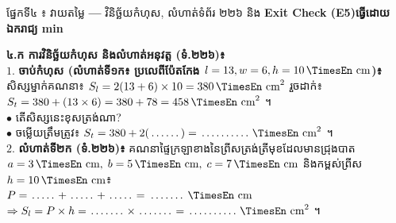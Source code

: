 \documentclass[a4paper,10pt]{article}
\newcommand{\en}[1]{{\TimesEn #1}}
\newcommand{\enbf}[1]{{\TimesEn\textbf{#1}}}
\newcommand{\unit}[1]{\,\text{\en{#1}}}
\newcommand{\blank}[1]{\makebox[#1]{\dotfill}}
\newcommand{\secbar}[2]{%
  \vspace{3pt}%
  \begin{tcolorbox}[
    enhanced, sharp corners, colback=headgray, colframe=black,
    boxrule=0.9pt, boxsep=1pt, top=2.5pt, bottom=2.5pt, left=6pt, right=6pt,
    after skip=3pt
  ]
    {\muol\fontsize{9.2pt}{13.5pt}\selectfont #1}\hfill{\fontsize{8.3pt}{11.5pt}\selectfont\textbf{#2}}
  \end{tcolorbox}%
}
\begin{document}
\vspace{7pt}
\secbar{ផ្នែកទី៤ ៖ វាយតម្លៃ \enbf{---} វិនិច្ឆ័យកំហុស, លំហាត់ទំព័រ ២២៦ និង \enbf{Exit Check (E5)}}{ធ្វើដោយឯករាជ្យ \en{10 min}}

\noindent
\begin{minipage}[t]{10.3cm}\vspace{0pt}
  \begin{tcolorbox}[
    enhanced, sharp corners, colback=white, colframe=black, equal height group=rowE5,
    boxrule=0.85pt, boxsep=3pt, top=5pt, bottom=5pt, left=5.5pt, right=5.5pt
  ]
    \textbf{៤.ក ការវិនិច្ឆ័យកំហុស និងលំហាត់អនុវត្ត (ទំ.២២៦)៖}\\[4.5pt]
    $1.$ \textbf{ចាប់កំហុស (លំហាត់ទី១ក៖ ប្រលេពីប៉ែតកែង $l=13, w=6, h=10\unit{cm}$)៖}\\
    សិស្សម្នាក់គណនា៖ $S_l = 2(13+6)\times 10 = 380\unit{cm}^2$ រួចដាក់៖\\[2pt]
    \hspace*{0.3cm}$S_t = 380 + (13\times 6) = 380 + 78 = 458\unit{cm}^2$ ។\\[4pt]
    $\bullet$ តើសិស្សនេះខុសត្រង់ណា? \blank{5.5cm}\\[5pt]
    $\bullet$ ចម្លើយត្រឹមត្រូវ៖ $S_t = 380 + 2(\blank{1.0cm}) = \blank{1.6cm}\unit{cm}^2$ ។\\[7pt]
    $2.$ \textbf{លំហាត់ទី២ក (ទំ.២២៦)៖} គណនាផ្ទៃក្រឡាខាងនៃព្រីសត្រង់ត្រីមុខដែលមានជ្រុងបាត $a=3\unit{cm},\; b=5\unit{cm},\; c=7\unit{cm}$ និងកម្ពស់ព្រីស $h=10\unit{cm}$៖\\[4.5pt]
    \hspace*{0.2cm}$P = \blank{0.8cm} + \blank{0.8cm} + \blank{0.8cm} = \blank{1.2cm}\unit{cm}$\\[4.5pt]
    \hspace*{0.2cm}$\Rightarrow S_l = P \times h = \blank{1.1cm} \times \blank{1.1cm} = \blank{1.6cm}\unit{cm}^2$ ។
  \end{tcolorbox}
\end{minipage}%
\hfill
\end{document}
